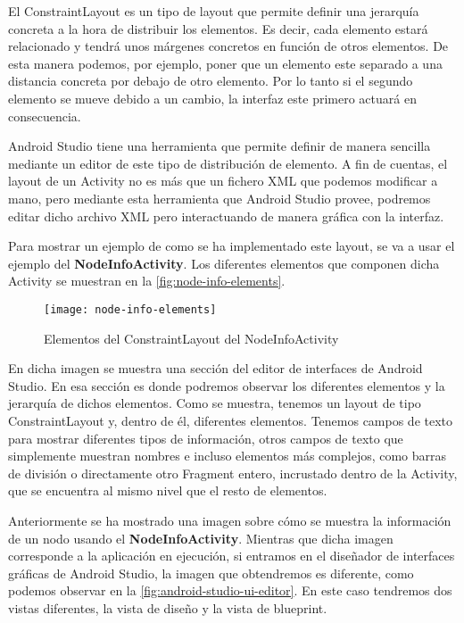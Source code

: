 El ConstraintLayout es un tipo de layout que permite definir una jerarquía concreta a la hora de distribuir los elementos. Es decir, cada elemento estará relacionado y tendrá unos márgenes concretos en función de otros elementos. De esta manera podemos, por ejemplo, poner que un elemento este separado a una distancia concreta por debajo de otro elemento. Por lo tanto si el segundo elemento se mueve debido a un cambio, la interfaz este primero actuará en consecuencia.

Android Studio tiene una herramienta que permite definir de manera sencilla mediante un editor de este tipo de distribución de elemento. A fin de cuentas, el layout de un Activity no es más que un fichero XML que podemos modificar a mano, pero mediante esta herramienta que Android Studio provee, podremos editar dicho archivo XML pero interactuando de manera gráfica con la interfaz.

Para mostrar un ejemplo de como se ha implementado este layout, se va a usar el ejemplo del \textbf{NodeInfoActivity}. Los diferentes elementos que componen dicha Activity se muestran en la \autoref{fig:node-info-elements}.

\begin{figure}[H]
	\centering
	\texttt{[image: node-info-elements]}
	\caption{Elementos del ConstraintLayout del NodeInfoActivity}
	\label{fig:node-info-elements}
\end{figure}

En dicha imagen se muestra una sección del editor de interfaces de Android Studio. En esa sección es donde podremos observar los diferentes elementos y la jerarquía de dichos elementos. Como se muestra, tenemos un layout de tipo ConstraintLayout y, dentro de él, diferentes elementos. Tenemos campos de texto para mostrar diferentes tipos de información, otros campos de texto que simplemente muestran nombres e incluso elementos más complejos, como barras de división o directamente otro Fragment entero, incrustado dentro de la Activity, que se encuentra al mismo nivel que el resto de elementos.

Anteriormente se ha mostrado una imagen sobre cómo se muestra la información de un nodo usando el \textbf{NodeInfoActivity}. Mientras que dicha imagen corresponde a la aplicación en ejecución, si entramos en el diseñador de interfaces gráficas de Android Studio, la imagen que obtendremos es diferente, como podemos observar en la \autoref{fig:android-studio-ui-editor}. En este caso tendremos dos vistas diferentes, la vista de diseño y la vista de blueprint. 

